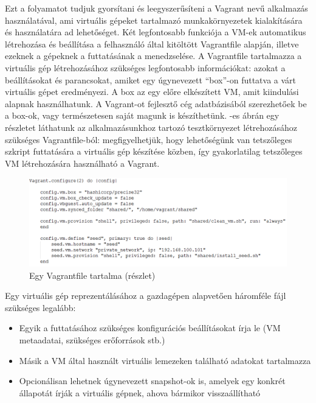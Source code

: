 Ezt a folyamatot tudjuk gyorsítani és leegyszerűsíteni a Vagrant\cite{vagrant} nevű alkalmazás használatával, ami virtuális gépeket tartalmazó munkakörnyezetek kialakítására és használatára ad lehetőséget. Két legfontosabb funkciója a VM-ek automatikus létrehozása és beállítása a felhasználó által kitöltött Vagrantfile alapján, illetve ezeknek a gépeknek a futtatásának a menedzselése. A Vagrantfile tartalmazza a virtuális gép létrehozásához szükséges legfontosabb információkat: azokat a beállításokat és parancsokat, amiket egy úgynevezett ``box''-on futtatva a várt virtuális gépet eredményezi. A box az egy előre elkészített VM, amit kiindulási alapnak használhatunk. A Vagrant-ot fejlesztő cég adatbázisából\cite{atlas} szerezhetőek be a box-ok, vagy természetesen saját magunk is készíthetünk. -es ábrán egy részletet láthatunk az alkalmazásunkhoz tartozó tesztkörnyezet létrehozásához szükséges Vagrantfile-ból: megfigyelhetjük, hogy lehetőségünk van tetszőleges szkript futtatására a virtuális gép készítése közben, így gyakorlatilag tetszőleges VM létrehozására használható a Vagrant.

\begin{figure}[ht]
	\centering
	\includegraphics[width=140mm, keepaspectratio]{figures/vagrantfile.png}
	\caption{Egy Vagrantfile tartalma (részlet)}
	\label{fig:vagrantfile}
\end{figure}

Egy virtuális gép reprezentálásához a gazdagépen alapvetően háromféle fájl szükséges legalább:

\begin{itemize}
	\item Egyik a futtatásához szükséges konfigurációs beállításokat írja le (VM metaadatai, szükséges erőforrások stb.)
	\item Másik a VM által használt virtuális lemezeken található adatokat tartalmazza
	\item Opcionálisan lehetnek úgynevezett snapshot-ok is, amelyek egy konkrét állapotát írják a virtuális gépnek, ahova bármikor visszaállítható
\end{itemize}

